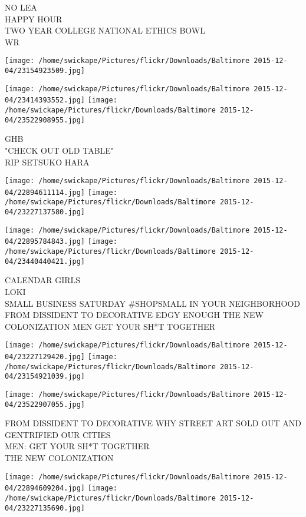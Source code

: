 \documentclass[10pt,letterpaper]{article}
\begin{document}
NO LEA\\
HAPPY HOUR\\
TWO YEAR COLLEGE NATIONAL ETHICS BOWL\\
WR
\pagebreak

\texttt{[image: /home/swickape/Pictures/flickr/Downloads/Baltimore 2015-12-04/23154923509.jpg]}

\vspace{0.25in}
\texttt{[image: /home/swickape/Pictures/flickr/Downloads/Baltimore 2015-12-04/23414393552.jpg]}
\texttt{[image: /home/swickape/Pictures/flickr/Downloads/Baltimore 2015-12-04/23522908955.jpg]}

GHB\\
"CHECK OUT OLD TABLE"\\
RIP SETSUKO HARA
\pagebreak

\texttt{[image: /home/swickape/Pictures/flickr/Downloads/Baltimore 2015-12-04/22894611114.jpg]}
\texttt{[image: /home/swickape/Pictures/flickr/Downloads/Baltimore 2015-12-04/23227137580.jpg]}

\texttt{[image: /home/swickape/Pictures/flickr/Downloads/Baltimore 2015-12-04/22895784843.jpg]}
\texttt{[image: /home/swickape/Pictures/flickr/Downloads/Baltimore 2015-12-04/23440440421.jpg]}

CALENDAR GIRLS\\
LOKI\\
SMALL BUSINESS SATURDAY \#SHOPSMALL IN YOUR NEIGHBORHOOD\\
FROM DISSIDENT TO DECORATIVE EDGY ENOUGH THE NEW COLONIZATION MEN GET YOUR SH*T TOGETHER
\pagebreak

\texttt{[image: /home/swickape/Pictures/flickr/Downloads/Baltimore 2015-12-04/23227129420.jpg]}
\texttt{[image: /home/swickape/Pictures/flickr/Downloads/Baltimore 2015-12-04/23154921039.jpg]}

\vspace{0.25in}
\texttt{[image: /home/swickape/Pictures/flickr/Downloads/Baltimore 2015-12-04/23522907055.jpg]}

FROM DISSIDENT TO DECORATIVE WHY STREET ART SOLD OUT AND GENTRIFIED OUR CITIES\\
MEN: GET YOUR SH*T TOGETHER\\
THE NEW COLONIZATION
\pagebreak

\texttt{[image: /home/swickape/Pictures/flickr/Downloads/Baltimore 2015-12-04/22894609204.jpg]}
\texttt{[image: /home/swickape/Pictures/flickr/Downloads/Baltimore 2015-12-04/23227135690.jpg]}
\end{document}
